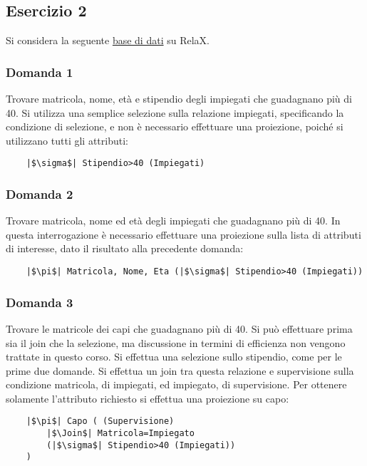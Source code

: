 \documentclass{article}
\numberwithin{equation}{subsection}
\begin{document}
\subsection{Esercizio 2}

Si considera la seguente \href{https://dbis-uibk.github.io/relax/calc/gist/b7a8eac38317e0d6a7f0b904a9a10bd3}{base di dati} su RelaX.


\subsubsection*{Domanda 1}

Trovare matricola, nome, età e stipendio degli impiegati che guadagnano più di 40. Si utilizza una semplice selezione sulla relazione impiegati, specificando la condizione di selezione, e non è necessario 
effettuare una proiezione, poiché si utilizzano tutti gli attributi: 

\begin{verbatim}
    |$\sigma$| Stipendio>40 (Impiegati)
\end{verbatim}

\subsubsection*{Domanda 2}

Trovare matricola, nome ed età degli impiegati che guadagnano più di 40. In questa interrogazione è necessario effettuare una proiezione sulla lista di attributi di interesse, dato il risultato alla precedente 
domanda:

\begin{verbatim}
    |$\pi$| Matricola, Nome, Eta (|$\sigma$| Stipendio>40 (Impiegati))
\end{verbatim}

\subsubsection*{Domanda 3}

Trovare le matricole dei capi che guadagnano più di 40. Si può effettuare prima sia il join che la selezione, ma discussione in termini di efficienza non vengono trattate in questo corso. Si effettua una selezione 
sullo stipendio, come per le prime due domande. Si effettua un join tra questa relazione e supervisione sulla condizione matricola, di impiegati, ed impiegato, di supervisione. Per ottenere solamente l'attributo 
richiesto si effettua una proiezione su capo:
\begin{verbatim}
    |$\pi$| Capo ( (Supervisione)
        |$\Join$| Matricola=Impiegato
        (|$\sigma$| Stipendio>40 (Impiegati))
    )
\end{verbatim}
\end{document}
